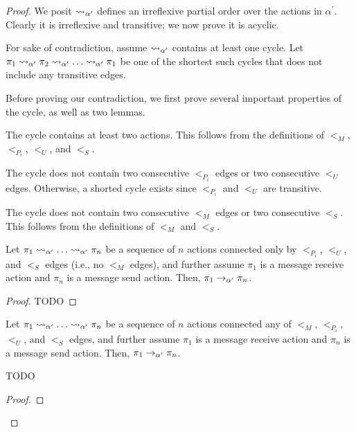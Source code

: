 \begin{proof}
  We posit $\rightsquigarrow_{\alpha^\prime}$ defines an irreflexive partial order over the actions
  in $\alpha^\prime$. Clearly it is irreflexive and transitive; we now prove it is acyclic.

  For sake of contradiction, assume $\rightsquigarrow_{\alpha^\prime}$ contains at least one cycle. Let
  $\pi_1 \rightsquigarrow_{\alpha^\prime} \pi_2 \rightsquigarrow_{\alpha^\prime} \ldots \rightsquigarrow_{\alpha^\prime} \pi_1$
  be one of the shortest such cycles that does not include any transitive edges.

  Before proving our contradiction, we first prove several important properties of the cycle,
  as well as two lemmas.

   The cycle contains at least two actions.
  This follows from the definitions of $<_M$, $<_{P_i}$, $<_U$, and $<_S$.

   The cycle does not contain two consecutive
  $<_{P_i}$ edges or two consecutive $<_U$ edges. Otherwise, a shorted cycle
  exists since $<_{P_i}$ and $<_U$ are transitive.

   The cycle does not contain two consecutive
  $<_M$ edges or two consecutive $<_S$. This follows from the definitions of
  $<_M$ and $<_S$.

  \begin{lemma}
    Let $\pi_1 \rightsquigarrow_{\alpha^\prime} \ldots \rightsquigarrow_{\alpha^\prime} \pi_n$
    be a sequence of $n$ actions connected only by
    $<_{P_i}$, $<_U$, and $<_S$ edges (i.e., no $<_M$ edges), and further
    assume $\pi_1$ is a message receive action and $\pi_n$ is a message
    send action. Then, $\pi_1 \rightarrow_{\alpha^\prime} \pi_n$.
    \label{lemma:helper1}
  \end{lemma}

  \begin{proof}
    TODO
  \end{proof}

  \begin{lemma}
    Let $\pi_1 \rightsquigarrow_{\alpha^\prime} \ldots \rightsquigarrow_{\alpha^\prime} \pi_n$
    be a sequence of $n$ actions connected any of $<_M$, $<_{P_i}$, $<_U$,
    and $<_S$ edges, and further assume $\pi_1$ is a message receive action
    and $\pi_n$ is a message send action. Then, $\pi_1 \rightarrow_{\alpha^\prime} \pi_n$.
    \label{lemma:helper2}
  \end{lemma}
    TODO
  \begin{proof}
    
  \end{proof}


\end{proof}
